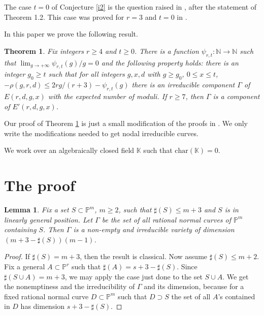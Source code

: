 \documentclass{amsart}
\theoremstyle{plain}
\newtheorem{theorem}{Theorem}
\newtheorem{lemma}{Lemma}
\theoremstyle{definition}
\begin{document}
The case $t=0$ of Conjecture \ref{i2} is the question raised in \cite{l2}, after the statement of Theorem 1.2. This case was proved for $r=3$ and $t=0$ in \cite{p}.

In this paper we prove the following result.

\begin{theorem}\label{i3}
Fix integers $r\ge 4$ and $t\ge 0$. There is a function $\psi _{r,t}: \mathbb {N} \to \mathbb {N}$ such that $\lim _{g\to +\infty} \psi_{r,t}(g)/g = 0$ and the following property holds:
there is an integer $g_0 \ge t$ such that for all integers $g, x, d$ with $g\ge g_0$, $0\le x \le t$, $-\rho (g,r,d)\le 2rg/(r+3) -\psi_{r,t}(g)$ there is an irreducible
component $\Gamma$ of $E(r,d,g,x)$ with the expected number of moduli. If $r\ge 7$, then $\Gamma$ is a component of $E'(r,d,g,x)$.
\end{theorem}

Our proof of Theorem \ref{i3} is just a small modification of the proofs in \cite{l2}. We only write the modifications needed to get
nodal irreducible curves.

We work over an algebraically closed field $\mathbb {K}$ such that $\mbox{char}(\mathbb {K})=0$.

\section{The proof}\label{S2}




\begin{lemma}\label{a00}
Fix a set $S\subset \mathbb {P}^m$, $m \ge 2$, such that $\sharp (S) \le m+3$ and $S$ is in linearly general position. Let $\Gamma$ be the set of all rational normal curves of $\mathbb {P}^m$
containing $S$. Then $\Gamma$ is a non-empty and irreducible variety of dimension $(m+3-\sharp (S))(m-1)$.
\end{lemma}

\begin{proof}
If $\sharp (S)=m+3$, then the result is classical. Now assume $\sharp (S)\le m+2$. Fix a general $A\subset \mathbb {P}^r$ such that $\sharp (A)=s+3-\sharp (S)$. Since $\sharp (S\cup A) =m+3$,
we may apply the case just done to the set $S\cup A$. We get the nonemptiness and the irreducibility of $\Gamma$ and its dimension, because
for a fixed rational normal curve $D\subset \mathbb {P}^m$ such that $D\supset S$ the set of all $A$'s contained in $D$ has dimension $s+3-\sharp (S)$.
\end{proof}
\end{document}
